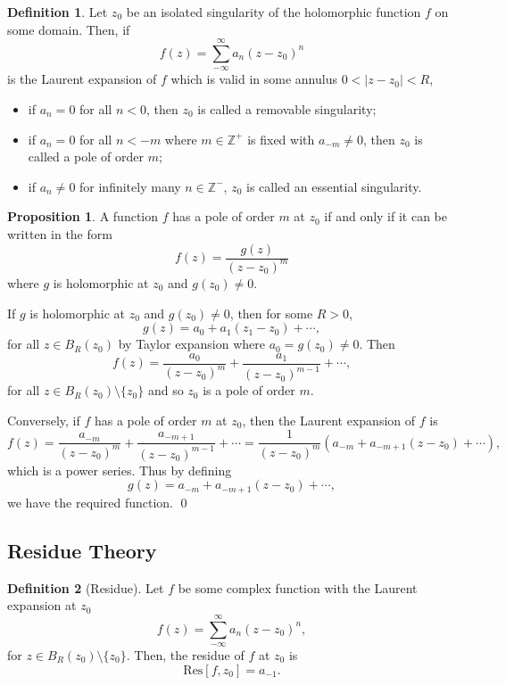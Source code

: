 \documentclass[
]{article}
\theoremstyle{definition}
\newtheorem{prop}{Proposition}
\theoremstyle{definition}
\newtheorem{definition}{Definition}[section]
\begin{document}
\begin{definition}
  Let \(z_0\) be an isolated singularity of the holomorphic function \(f\) on some 
  domain. Then, if
  \[f(z) = \sum_{-\infty}^\infty a_n (z - z_0)^n\]
  is the Laurent expansion of \(f\) which is valid in some annulus \(0 < |z - z_0| < R\), 
  \begin{itemize}
    \item if \(a_n = 0\) for all \(n < 0\), then \(z_0\) is called a removable singularity;
    \item if \(a_n = 0\) for all \(n < -m\) where \(m \in \mathbb{Z}^+\) is fixed with 
      \(a_{-m} \neq 0\), then \(z_0\) is called a pole of order \(m\);
    \item if \(a_n \neq 0\) for infinitely many \(n \in \mathbb{Z}^-\), \(z_0\) is 
      called an essential singularity.
  \end{itemize}
\end{definition}

\begin{prop}
  A function \(f\) has a pole of order \(m\) at \(z_0\) if and only if it can be 
  written in the form 
  \[f(z) = \frac{g(z)}{(z - z_0)^m}\]
  where \(g\) is holomorphic at \(z_0\) and \(g(z_0) \neq 0\).
\end{prop}
\proof

If \(g\) is holomorphic at \(z_0\) and \(g(z_0) \neq 0\), then for some
\(R > 0\), \[g(z) = a_0 + a_1(z_1 - z_0) + \cdots,\] for all
\(z \in B_R(z_0)\) by Taylor expansion where \(a_0 = g(z_0) \neq 0\).
Then
\[f(z) = \frac{a_0}{(z - z_0)^m} + \frac{a_1}{(z - z_0)^{m - 1}} + \cdots,\]
for all \(z \in B_R(z_0) \setminus \{z_0\}\) and so \(z_0\) is a pole of
order \(m\).

Conversely, if \(f\) has a pole of order \(m\) at \(z_0\), then the
Laurent expansion of \(f\) is
\[f(z) = \frac{a_{- m}}{(z - z_0)^m} + \frac{a_{- m + 1}}{(z - z_0)^{m - 1}} + \cdots
    = \frac{1}{(z - z_0)^m}(a_{- m} + a_{- m + 1}(z - z_0) + \cdots),\]
which is a power series. Thus by defining
\[g(z) = a_{- m} + a_{- m + 1}(z - z_0) + \cdots,\] we have the required
function. \qed

\hypertarget{residue-theory}{%
\subsection{Residue Theory}\label{residue-theory}}

\begin{definition}[Residue]
  Let \(f\) be some complex function with the Laurent expansion at \(z_0\) 
  \[f(z) = \sum_{- \infty}^\infty a_n(z - z_0)^n,\]
  for \(z \in B_R(z_0) \setminus \{z_0\}\). Then, the residue of \(f\) at \(z_0\) 
  is 
  \[\text{Res}[f, z_0] = a_{-1}.\]
\end{definition}
\end{document}
